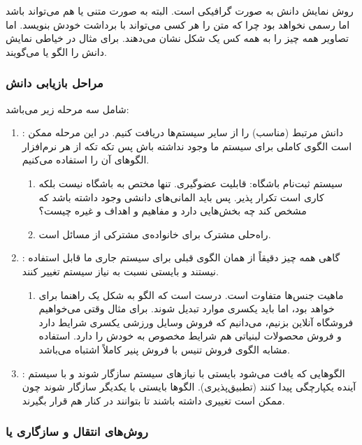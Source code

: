 روش نمایش دانش به صورت گرافیکی است. البته به صورت متنی یا  هم می‌تواند
باشد اما رسمی نخواهد بود چرا که متن را هر کسی می‌تواند با برداشت خودش بنویسد.
اما تصاویر همه چیز را به همه کس یک شکل نشان می‌دهند. برای مثال در خیاطی نمایش
دانش را الگو یا  می‌گویند.

\subsubsection*{مراحل بازیابی دانش}

شامل سه مرحله زیر می‌باشد:

\begin{enumerate}
    \item {}: دانش مرتبط (مناسب) را از سایر سیستم‌ها دریافت کنیم. در
    این مرحله ممکن است الگوی کاملی برای سیستم ما وجود نداشته باش پس تکه تکه از
    هر نرم‌افزار الگو‌های آن را استفاده می‌کنیم. \begin{enumerate}
        \item سیستم ثبت‌نام باشگاه: قابلیت عضوگیری. تنها مختص به باشگاه نیست
        بلکه کاری است تکرار پذیر. پس باید المانی‌های دانشی وجود داشته باشد که
        مشخص کند چه بخش‌هایی دارد و مفاهیم و اهداف و غیره چیست؟
        \item راه‌حلی مشترک برای خانواده‌ی مشترکی از مسائل است.
    \end{enumerate}
    \item {}: گاهی همه چیز دقیقاً از همان الگوی قبلی برای سیستم جاری
    ما قابل استفاده نیستند و بایستی نسبت به نیاز سیستم تغییر کنند. \begin{enumerate}
        \item ماهیت جنس‌ها متفاوت است. درست است که الگو به شکل یک راهنما برای
         خواهد بود، اما باید یکسری موارد تبدیل شوند. برای مثال
        وقتی می‌خواهیم فروشگاه آنلاین بزنیم، می‌دانیم که فروش وسایل ورزشی یکسری
        شرایط دارد و فروش محصولات لبنیاتی هم شرایط مخصوص به خودش را دارد.
        استفاده مشابه الگوی فروش تنیس با فروش پنیر کاملاً اشتباه می‌باشد.
    \end{enumerate}
    \item {}: الگو‌هایی که یافت می‌شود بایستی با نیاز‌های سیستم
    سازگار شوند و با سیستم آینده یکپارچگی پیدا کنند (تطبیق‌پذیری). الگو‌ها
    بایستی با یکدیگر سازگار شوند چون ممکن است تغییری داشته باشند تا بتوانند در
    کنار هم قرار بگیرند.
\end{enumerate}

\subsubsection*{روش‌های انتقال و سازگاری یا }

